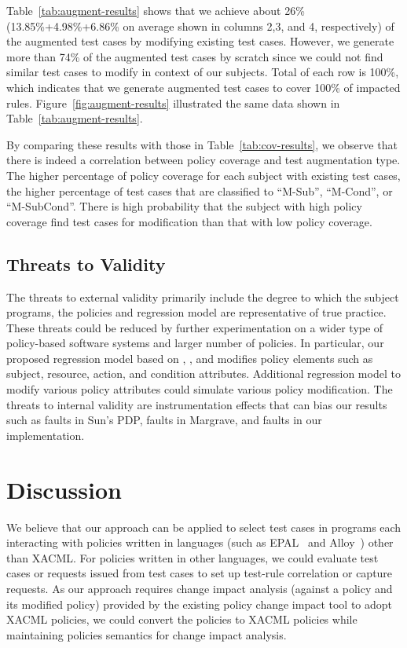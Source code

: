 Table~\ref{tab:augment-results} shows that we achieve
about 26\% (13.85\%+4.98\%+6.86\% on average shown in columns 2,3, and 4, respectively) of the augmented test cases by modifying existing test
cases. However, we generate more than 74\% of the augmented test cases by scratch since we could not find similar
test cases to modify in context of our subjects. Total of each row is 100\%, which indicates that we
generate  augmented test cases to cover 100\% of impacted rules.
Figure~\ref{fig:augment-results} illustrated
the same data shown in Table~\ref{tab:augment-results}.

By comparing these results with those in Table~\ref{tab:cov-results}, we observe that there is indeed a correlation between policy coverage and 
test augmentation type.
The higher percentage of policy coverage for each subject with existing test cases,
the higher percentage of test cases that
are classified to ``M-Sub'', ``M-Cond'', or ``M-SubCond''.
There is high probability that the subject with high policy coverage
find test cases  for modification than that with low policy coverage.

%

\subsection{Threats to Validity}
The threats to external validity primarily include the degree to
which the subject programs, the policies and regression model are representative of true practice.
These threats
could be reduced by further experimentation on a wider type of policy-based software systems and
larger number of policies.
In particular, our proposed regression model based on , ,
and  modifies policy elements such as subject, resource, action, and condition attributes.
Additional regression model to modify various policy attributes could
simulate various policy modification.
The threats to internal validity are instrumentation effects
that can bias our results such as faults in Sun's PDP, faults in Margrave, and
faults in our implementation.


\section{Discussion}\label{sec:discussion}
We believe that our approach can be applied to select
test cases in programs each interacting
with policies written in languages (such as EPAL~\cite{epal} and Alloy~\cite{jackson01:micromodularity}) other than XACML.
For policies written in other languages, we could evaluate test cases or requests issued from test cases
to set up test-rule correlation or capture requests. 
As our approach requires change impact analysis (against a policy and
its modified policy) provided by the existing policy change impact tool to adopt
XACML policies, we could convert the policies to XACML policies
while maintaining policies semantics for change impact analysis.


